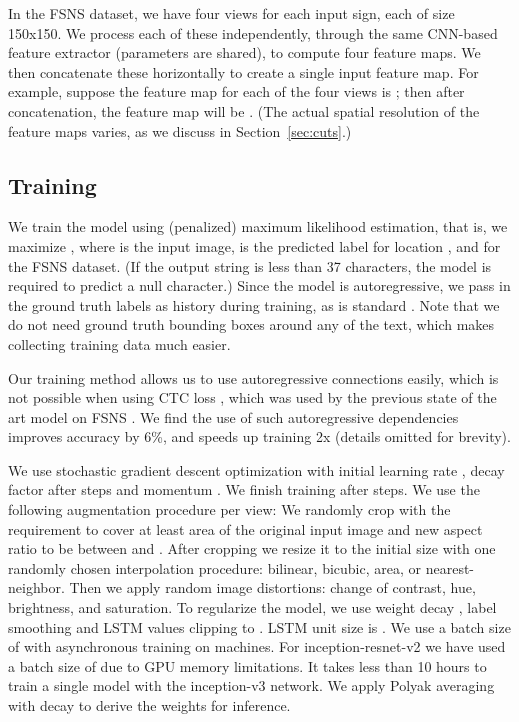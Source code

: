 \documentclass[conference]{IEEEtran}
\begin{document}
In the FSNS dataset, we have four views for each input sign,
each of size 150x150. We process each of these independently, through
the same CNN-based feature extractor (parameters are shared), to
compute four feature maps.
We then concatenate these horizontally
to create a single input feature map.
For example, suppose the feature map for each
of the four views
is ;
then after concatenation, the feature map
 will be .
(The actual spatial resolution of the feature maps varies,
as we discuss in Section~\ref{sec:cuts}.)


\subsection{Training}

We train the model using (penalized) maximum likelihood estimation,
that is, we maximize , where 
is the input image,  is the predicted label for location , and
 for the FSNS dataset. (If the output string is less than 37
characters, the model is required to predict a null character.)
Since the model is autoregressive,
we pass in the ground truth labels as history during training,
as is standard \cite{Sutskever2014}.
Note that we do not need ground truth bounding boxes around any of the
text, which makes collecting training data much easier.

Our training method
allows us to use autoregressive connections easily,
which is not possible  when using CTC loss \cite{graves2006connectionist},
which was used by 
the previous state of the art model on FSNS \cite{smith2016end}.
We find the use of such autoregressive dependencies
improves  accuracy by 6\%, and speeds up training 2x
(details omitted for brevity).

We use stochastic gradient descent optimization with initial learning
rate , decay factor  after  steps and momentum
. We finish training after  steps. We use the following augmentation procedure per view: We
randomly crop with the requirement to cover at least  area of the
original input image and new aspect ratio to be between  and
. After cropping we resize it to the initial size with one
randomly chosen interpolation procedure: bilinear, bicubic, area, or
nearest-neighbor. Then we apply random image distortions: change of
contrast, hue, brightness, and saturation. To regularize the model, we
use weight decay , label smoothing  \cite{szegedy2015rethinking} and LSTM values
clipping to . LSTM unit size is . We use a batch size of 
with asynchronous training on  machines. For inception-resnet-v2 we have
used a batch size of  due to GPU memory limitations. It takes less than 10
hours to train a single model with the inception-v3 network. We apply Polyak averaging
\cite{polyak1992acceleration} with decay  to derive the
weights for inference. 
\end{document}

